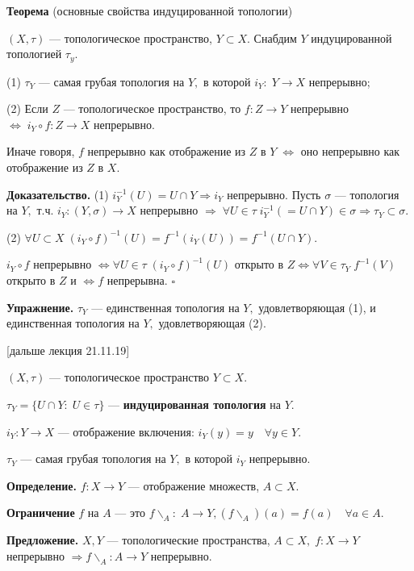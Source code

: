\documentclass[12pt,a4paper]{article}
\begin{document}
\textbf{Теорема} (основные свойства индуцированной топологии)

$(X, \tau)$ --- топологическое пространство, $Y \subset X.$ Снабдим $Y$ индуцированной топологией $\tau_{y}.$ 

(1) $\tau_{Y}$ --- самая грубая топология на $Y,$ в которой $i_{Y}: \; Y \to X$ непрерывно;

(2) Если $Z$ --- топологическое пространство, то $f: Z \to Y$ непрерывно $\Leftrightarrow \; i_{Y} \circ f: Z \to X$ непрерывно. 

Иначе говоря, $f$ непрерывно как отображение из $Z$ в $Y \; \Leftrightarrow$ оно непрерывно как отображение из $Z$ в $X.$ 

\textbf{Доказательство.} (1) $i_{Y}^{-1}(U) = U \cap Y \Rightarrow i_{Y}$ непрерывно. Пусть $\sigma$ --- топология на $Y,$ т.ч. $i_{Y}: (Y, \sigma) \to X$ непрерывно $\Rightarrow \; \forall U \in \tau \; i_{Y}^{-1} (= U \cap Y) \in \sigma \Rightarrow \tau_{Y} \subset \sigma.$ 

(2) $\forall U \subset X \; (i_{Y} \circ f)^{-1}(U) = f^{-1}(i_{Y}(U)) = f^{-1}(U \cap Y).$

$i_{Y} \circ f$ непрерывно $\Leftrightarrow \forall U \in \tau \; (i_{Y} \circ f)^{-1}(U)$ открыто в $Z \Leftrightarrow \forall V \in \tau_{Y} \; f^{-1}(V)$ открыто в $Z$ и $\Leftrightarrow f$ непрерывна. $\square$

\textbf{Упражнение.} $\tau_{Y}$ --- единственная топология на $Y,$ удовлетворяющая (1), и единственная топология на $Y,$ удовлетворяющая (2).

[дальше лекция 21.11.19]

$(X, \tau)$ --- топологическое пространство $Y \subset X.$ 

$\tau_{Y} = \{U \cap Y: \; U \in \tau\}$ --- \textbf{индуцированная топология} на $Y.$ 

$i_{Y}: Y \to X$ --- отображение включения: $i_{Y}(y) = y \quad \forall y \in Y.$

$\tau_{Y}$ --- самая грубая топология на $Y,$ в которой $i_{Y}$ непрерывно. 

\textbf{Определение.} $f: X \to Y$ --- отображение множеств, $A \subset X.$ 

\textbf{Ограничение} $f$ на $A$ --- это $f\backslash_{A}: \; A \to Y, (f\backslash_{A})(a) = f(a) \quad \forall a \in A.$ 

\textbf{Предложение.} $X, Y$ --- топологические пространства, $A \subset X, \; f: X \to Y$ непрерывно $\Rightarrow f \backslash_{A}: A \to Y$ непрерывно. 
\end{document}
